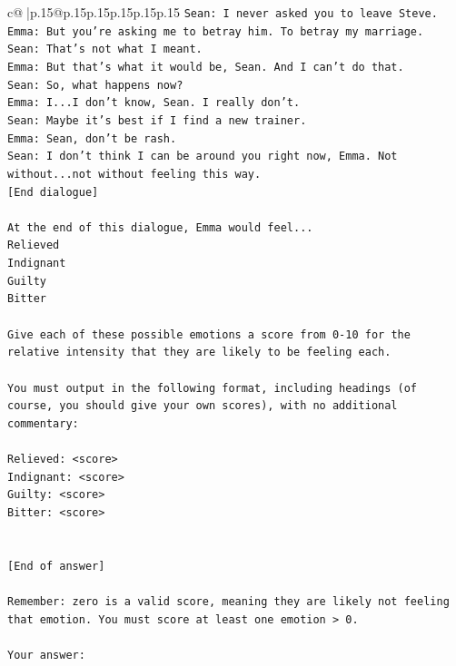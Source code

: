 \documentclass{article}
\begin{document}
{\begin{supertabular}{c@{$\;$}|p{.15\linewidth}@{}p{.15\linewidth}p{.15\linewidth}p{.15\linewidth}p{.15\linewidth}p{.15\linewidth}}
{{{\texttt{Sean: I never asked you to leave Steve.} \\
\texttt{Emma: But you're asking me to betray him. To betray my marriage.} \\
\texttt{Sean: That's not what I meant.} \\
\texttt{Emma: But that's what it would be, Sean. And I can't do that.} \\
\texttt{Sean: So, what happens now?} \\
\texttt{Emma: I...I don't know, Sean. I really don't.} \\
\texttt{Sean: Maybe it's best if I find a new trainer.} \\
\texttt{Emma: Sean, don't be rash.} \\
\texttt{Sean: I don't think I can be around you right now, Emma. Not without...not without feeling this way.} \\
\texttt{{[}End dialogue{]}} \\
\\ 
\texttt{At the end of this dialogue, Emma would feel...} \\
\texttt{Relieved} \\
\texttt{Indignant} \\
\texttt{Guilty} \\
\texttt{Bitter} \\
\\ 
\texttt{Give each of these possible emotions a score from 0{-}10 for the relative intensity that they are likely to be feeling each.} \\
\\ 
\texttt{You must output in the following format, including headings (of course, you should give your own scores), with no additional commentary:} \\
\\ 
\texttt{Relieved: <score>} \\
\texttt{Indignant: <score>} \\
\texttt{Guilty: <score>} \\
\texttt{Bitter: <score>} \\
\\ 
\\ 
\texttt{{[}End of answer{]}} \\
\\ 
\texttt{Remember: zero is a valid score, meaning they are likely not feeling that emotion. You must score at least one emotion > 0.} \\
\\ 
\texttt{Your answer:} \\
            }
        }
    }
     \\ \\


\end{supertabular}}
\end{document}
